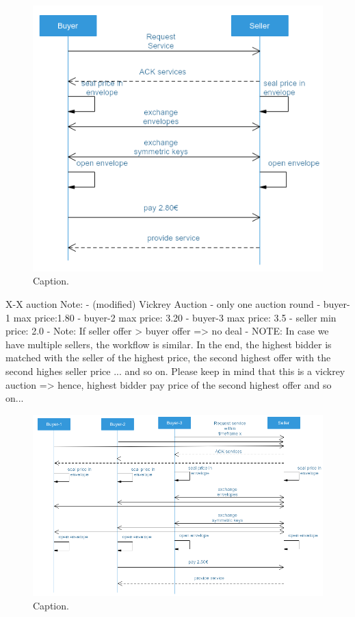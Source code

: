 \documentclass{llncs}
\begin{document}
{			\begin{figure}[H]
				\centering
				\includegraphics[scale=0.4]{Figures/auction/20180501_auction-aglorithms--1-to-1.png}
				\caption{Caption.}	
				\label{fig:auction-algorithm-1-1}
			\end{figure}
			
			X-X auction
			Note: 
			- (modified) Vickrey Auction
			- only one auction round
			- buyer-1 max price:1.80
			- buyer-2 max price: 3.20
			- buyer-3 max price: 3.5
			- seller min price: 2.0
			- Note: If seller offer > buyer offer => no deal
			- NOTE: In case we have multiple sellers, the workflow is similar. In the end, the highest bidder is matched with the seller of the highest price, the second highest offer with the second highes seller price ... and so on. Please keep in mind that this is a vickrey auction => hence, highest bidder pay price of the second highest offer and so on...

			\begin{figure}[H]
				\centering
				\includegraphics[scale=0.4]{Figures/auction/20180501_auction-aglorithms--X-to-X.png}
				\caption{Caption.}	
				\label{fig:auction-algorithm-X-X}
			\end{figure}			

}
\end{document}
